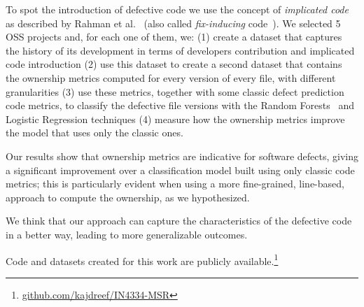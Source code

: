 To spot the introduction of defective code we use the concept of \textit{implicated code} as described by Rahman et al.~\cite{Rahman:blame} (also called \textit{fix-inducing} code~\cite{sliwerski2005changes}). 
We selected 5 OSS projects and, for each one of them, we: (1) create  a dataset that captures the history of its development in terms of developers contribution and implicated code introduction (2) use this dataset to create a second dataset that contains the ownership metrics computed for every version of every file, with different granularities (3) use these metrics, together with some classic defect prediction code metrics, to classify the defective file versions with the Random Forests~\cite{breiman2001random} and Logistic Regression techniques (4) measure how the ownership metrics improve the model that uses only the classic ones.

Our results show that ownership metrics are indicative for software defects, giving a significant improvement over a classification model built using only classic code metrics; this is particularly evident when using a more fine-grained, line-based, approach to compute the ownership, as we hypothesized.

We think that our approach can capture the characteristics of the defective code in a better way, leading to more generalizable outcomes.

Code and datasets created for this work are publicly available.\footnote{\url{github.com/kajdreef/IN4334-MSR}}

